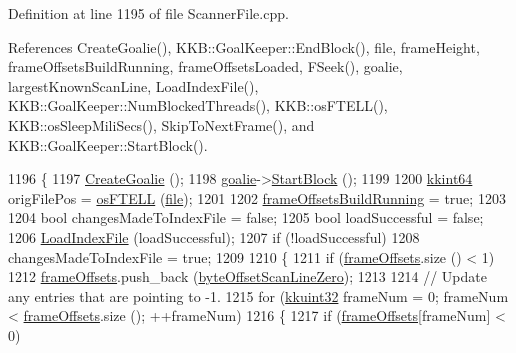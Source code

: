 Definition at line 1195 of file Scanner\+File.\+cpp.



References Create\+Goalie(), K\+K\+B\+::\+Goal\+Keeper\+::\+End\+Block(), file, frame\+Height, frame\+Offsets\+Build\+Running, frame\+Offsets\+Loaded, F\+Seek(), goalie, largest\+Known\+Scan\+Line, Load\+Index\+File(), K\+K\+B\+::\+Goal\+Keeper\+::\+Num\+Blocked\+Threads(), K\+K\+B\+::os\+F\+T\+E\+L\+L(), K\+K\+B\+::os\+Sleep\+Mili\+Secs(), Skip\+To\+Next\+Frame(), and K\+K\+B\+::\+Goal\+Keeper\+::\+Start\+Block().


\begin{DoxyCode}
1196 \{
1197   \hyperlink{class_k_k_l_s_c_1_1_scanner_file_a08e1b410a871d7dae4828143cec78c32}{CreateGoalie} ();
1198   \hyperlink{class_k_k_l_s_c_1_1_scanner_file_aea946a2d0dc2fb27b41ce5180679d3de}{goalie}->\hyperlink{class_k_k_b_1_1_goal_keeper_a2a9565f88cee7b4339c24ed4d5155419}{StartBlock} ();
1199 
1200   \hyperlink{namespace_k_k_b_aa3486b1c5ea9162b3b020c69f72826eb}{kkint64}  origFilePos = \hyperlink{namespace_k_k_b_a2cc11a5ae09d10d69ad751b549e5d94e}{osFTELL} (\hyperlink{class_k_k_l_s_c_1_1_scanner_file_a26db15f7823ce67b1621da17468ec807}{file});
1201 
1202   \hyperlink{class_k_k_l_s_c_1_1_scanner_file_a14b9267dc74c7a04f1965aa39c817f70}{frameOffsetsBuildRunning} = \textcolor{keyword}{true};
1203 
1204   \textcolor{keywordtype}{bool}  changesMadeToIndexFile = \textcolor{keyword}{false};
1205   \textcolor{keywordtype}{bool}  loadSuccessful = \textcolor{keyword}{false};
1206   \hyperlink{class_k_k_l_s_c_1_1_scanner_file_aeec72fa0edaa84fe363efa7a3b27f13d}{LoadIndexFile} (loadSuccessful);
1207   \textcolor{keywordflow}{if}  (!loadSuccessful)
1208     changesMadeToIndexFile = \textcolor{keyword}{true};
1209 
1210   \{
1211     \textcolor{keywordflow}{if}  (\hyperlink{class_k_k_l_s_c_1_1_scanner_file_a61d36c66bb5f16ba82c088cd816b0c68}{frameOffsets}.size () < 1)
1212       \hyperlink{class_k_k_l_s_c_1_1_scanner_file_a61d36c66bb5f16ba82c088cd816b0c68}{frameOffsets}.push\_back (\hyperlink{class_k_k_l_s_c_1_1_scanner_file_a648a1ee97c52ec2391e6ab5d63515b98}{byteOffsetScanLineZero});
1213 
1214     \textcolor{comment}{// Update any entries that are pointing to -1.}
1215     \textcolor{keywordflow}{for}  (\hyperlink{namespace_k_k_b_af8d832f05c54994a1cce25bd5743e19a}{kkuint32} frameNum = 0;  frameNum < \hyperlink{class_k_k_l_s_c_1_1_scanner_file_a61d36c66bb5f16ba82c088cd816b0c68}{frameOffsets}.size ();  ++frameNum)
1216     \{
1217       \textcolor{keywordflow}{if}  (\hyperlink{class_k_k_l_s_c_1_1_scanner_file_a61d36c66bb5f16ba82c088cd816b0c68}{frameOffsets}[frameNum] < 0)

\end{DoxyCode}
